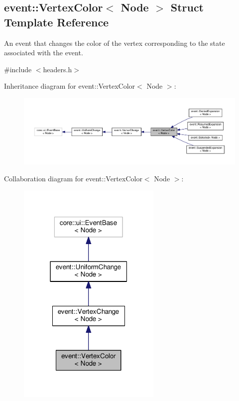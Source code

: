 \hypertarget{structevent_1_1VertexColor}{}\subsection{event\+:\+:Vertex\+Color$<$ Node $>$ Struct Template Reference}
\label{structevent_1_1VertexColor}


An event that changes the color of the vertex corresponding to the state associated with the event.  




{\ttfamily \#include $<$headers.\+h$>$}



Inheritance diagram for event\+:\+:Vertex\+Color$<$ Node $>$\+:\nopagebreak
\begin{figure}[H]
\begin{center}
\leavevmode
\includegraphics[width=350pt]{structevent_1_1VertexColor__inherit__graph}
\end{center}
\end{figure}


Collaboration diagram for event\+:\+:Vertex\+Color$<$ Node $>$\+:\nopagebreak
\begin{figure}[H]
\begin{center}
\leavevmode
\includegraphics[width=195pt]{structevent_1_1VertexColor__coll__graph}
\end{center}
\end{figure}

